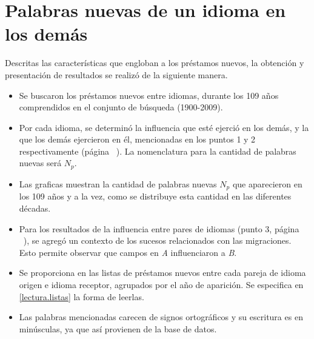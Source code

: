 \section{Palabras nuevas de un idioma en los demás} %

Descritas las características que engloban a los préstamos nuevos, la obtención y presentación de resultados se realizó de la siguiente manera. 



\begin{itemize}

\item Se buscaron los préstamos nuevos entre idiomas,  durante los 109 años comprendidos en el conjunto de búsqueda (1900-2009).
	
\item Por cada idioma, se determinó la influencia que esté ejerció en los demás, y la que los demás ejercieron en él, mencionadas en los puntos 1 y 2 respectivamente (página ~\pageref{proceso.nuevos}).   La nomenclatura para la cantidad de palabras nuevas será $N_{p}$.

\item Las graficas muestran la cantidad de palabras nuevas $N_{p}$ que aparecieron en los 109 años y a la vez, como se distribuye esta cantidad en las diferentes décadas. 

\item Para los resultados de la influencia entre pares de idiomas (punto 3, página ~\pageref{proceso.nuevos}), se agregó un contexto de los sucesos relacionados con las migraciones. Esto permite observar que campos en \textit{A} influenciaron a \textit{B}. 

\item Se proporciona en \cite{prestamos_nuevos} las listas  de préstamos nuevos entre cada pareja de idioma origen e idioma receptor, agrupados por el año de aparición.  Se especifica en \ref{lectura.listas}  la forma de leerlas.

\item Las palabras mencionadas carecen de signos ortográficos y su escritura es en minúsculas, ya que así provienen de la base de datos. 


\end{itemize}

